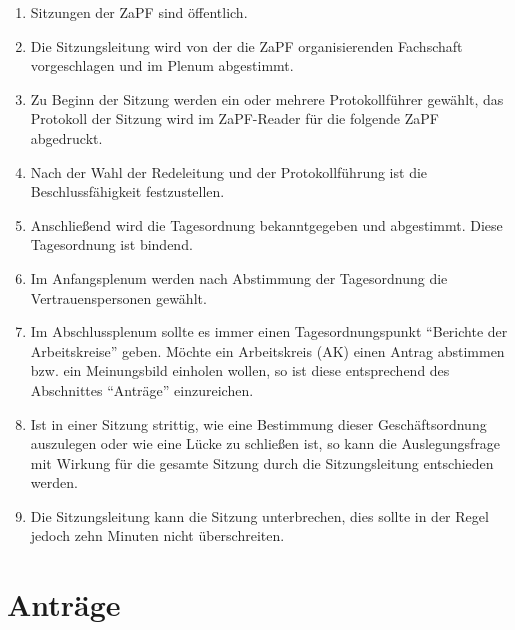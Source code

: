 \documentclass[draft,12pt,oneside]{scrreprt}
\begin{document}
\begin{enumerate}
  \item Sitzungen der ZaPF sind öffentlich.

  \item Die Sitzungsleitung wird von der die ZaPF organisierenden Fachschaft
        vorgeschlagen und im Plenum abgestimmt.

  \item Zu Beginn der Sitzung werden ein oder mehrere Protokollführer gewählt,
        das Protokoll der Sitzung wird im ZaPF-Reader für die folgende ZaPF
        abgedruckt.

  \item Nach der Wahl der Redeleitung und der Protokollführung ist die
        Beschlussfähigkeit festzustellen.

  \item Anschließend wird die Tagesordnung bekanntgegeben und abgestimmt.
        Diese Tagesordnung ist bindend.

  \item Im Anfangsplenum werden nach Abstimmung der Tagesordnung die
        Vertrauenspersonen gewählt.

  \item Im Abschlussplenum sollte es immer einen Tagesordnungspunkt ``Berichte
        der Arbeitskreise'' geben.
        Möchte ein Arbeitskreis (AK) einen Antrag abstimmen bzw. ein Meinungsbild
        einholen wollen, so ist diese entsprechend des Abschnittes ``Anträge''
        einzureichen.

  \item Ist in einer Sitzung strittig, wie eine Bestimmung dieser Geschäftsordnung
        auszulegen oder wie eine Lücke zu schließen ist, so kann die Auslegungsfrage
        mit Wirkung für die gesamte Sitzung durch die Sitzungsleitung entschieden
        werden.

  \item Die Sitzungsleitung kann die Sitzung unterbrechen, dies sollte in der
        Regel jedoch zehn Minuten nicht überschreiten.
\end{enumerate}

\section{Anträge}
\end{document}
